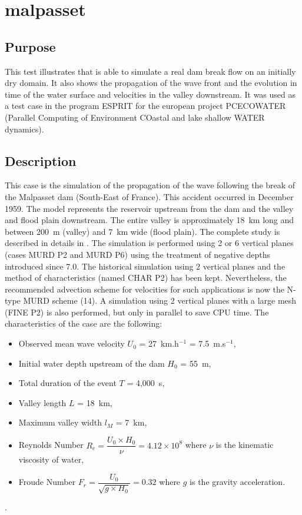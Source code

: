 \chapter{malpasset}

\section{Purpose}
%
This test illustrates that  is able to simulate a real dam break flow on an initially dry domain. It also shows the propagation of the wave front and the evolution in time of the water surface and velocities in the valley downstream. It was used as a test case in the program ESPRIT for the european project PCECOWATER (Parallel Computing of Environment COastal and lake shallow WATER dynamics).

\section{Description}
%
This case is the simulation of the propagation of the wave following the break of the Malpasset dam
(South-East of France). This accident occurred in December 1959.
The model represents the reservoir upstream from the dam and the valley and flood plain downstream.
The entire valley is approximately 18~km long and between 200~m (valley) and 7~km wide (flood plain).
The complete study is described in details in \cite{Hervouet2007}.
The simulation is performed using 2 or 6 vertical planes (cases MURD P2 and MURD P6)
using the treatment of negative depths introduced since  7.0.
The historical simulation using 2 vertical planes and the method of characteristics (named CHAR P2)
has been kept. Nevertheless, the recommended advection scheme for velocities for such applications
is now the N-type MURD scheme (14). A simulation using 2 vertical planes with a large mesh
(FINE P2) is also performed, but only in parallel to save CPU time.
The characteristics of the case are the following:
\begin{itemize}
  \itemsep0em
\item Observed mean wave velocity $U_0$ = 27~km.h$^{-1}$ = 7.5~m.s$^{-1}$,
\item Initial water depth upstream of the dam $H_0$ = 55~m,
\item Total duration of the event $T$ = 4,000~s,
\item Valley length $L$ = 18~km,
\item Maximum valley width $l_M$ = 7~km,
\item Reynolds Number \textbf{$R_e = \dfrac{U_0 \times H_0}{\nu} =  4.12 \times 10^8$} where $\nu$ is the kinematic viscosity of water,
\item Froude Number \textbf{$F_r = \dfrac{U_0}{\sqrt{g \times H_0}} = 0.32$} where $g$ is the gravity acceleration.
\end{itemize}.

